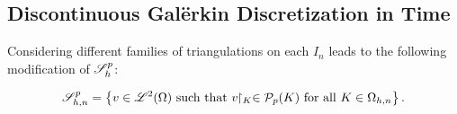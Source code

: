 \newpage
\subsection{Discontinuous Galërkin Discretization in Time} \label{sec:full_discretization}

Considering different families of triangulations on each $I_n$ leads to the following modification of $\mathscr{S}_h^p$:
\begin{definition}[$\SpaceSolution_{h, n}^p$]
    \begin{align}
        \mathscr{S}_{h, n}^p = \left\{ v \in \mathscr{L}^{2}(\Omega) \text{ such that } v \!\!\restriction_{K} \in \mathcal{P}_{p}(K) \text{ for all } K \in \Omega_{h, n} \right\}.
    \end{align}
\end{definition}

